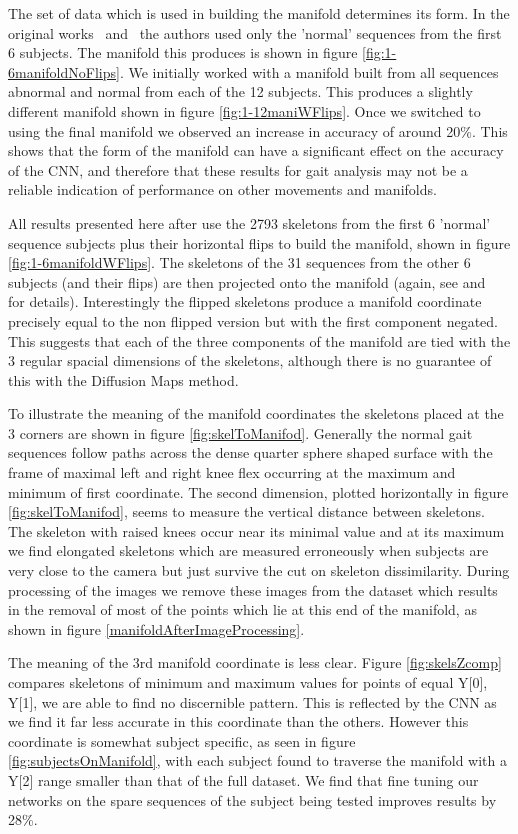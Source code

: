 \documentclass[11pt]{article} %
\begin{document}
The set of data which is used in building the manifold determines its form. In the original works~\cite{Paiement} and~\cite{Tao} the authors used only the 'normal' sequences from the first 6 subjects. The manifold this produces is shown in figure \ref{fig:1-6manifoldNoFlips}. We initially worked with a manifold built from all sequences abnormal and normal from each of the 12 subjects. This produces a slightly different manifold shown in figure \ref{fig:1-12maniWFlips}. Once we switched to using the final manifold we observed an increase in accuracy of around 20\%. This shows that the form of the manifold can have a significant effect on the accuracy of the CNN, and therefore that these results for gait analysis may not be a reliable indication of performance on other movements and manifolds.

All results presented here after use the 2793 skeletons from the first 6 'normal' sequence subjects plus their horizontal flips to build the manifold, shown in figure \ref{fig:1-6manifoldWFlips}. The skeletons of the 31 sequences from the other 6 subjects (and their flips) are then projected onto the manifold (again, see \cite{Paiement} and~\cite{Tao} for details). Interestingly the flipped skeletons produce a manifold coordinate precisely equal to the non flipped version but with the first component negated. This suggests that each of the three components of the manifold are tied with the 3 regular spacial dimensions of the skeletons, although there is no guarantee of this with the Diffusion Maps method. 

To illustrate the meaning of the manifold coordinates the skeletons placed at the 3 corners are shown in figure \ref{fig:skelToManifod}. Generally the normal gait sequences follow paths across the dense quarter sphere shaped surface with the frame of maximal left and right knee flex occurring at the maximum and minimum of first coordinate. The second dimension, plotted horizontally in figure \ref{fig:skelToManifod}, seems to measure the vertical distance between skeletons. The skeleton with raised knees occur near its minimal value and at its maximum we find elongated skeletons which are measured erroneously when subjects are very close to the camera but just survive the cut on skeleton dissimilarity. During processing of the images we remove these images from the dataset which results in the removal of most of the points which lie at this end of the manifold, as shown in figure \ref{manifoldAfterImageProcessing}. 

The meaning of the 3rd manifold coordinate is less clear. Figure \ref{fig:skelsZcomp} compares skeletons of minimum and maximum values for points of equal Y[0], Y[1], we are able to find no discernible pattern. This is reflected by the CNN as we find it far less accurate in this coordinate than the others. However this coordinate is somewhat subject specific, as seen in figure \ref{fig:subjectsOnManifold}, with each subject found to traverse the manifold with a Y[2] range smaller than that of the full dataset. We find that fine tuning our networks on the spare sequences of the subject being tested improves results by 28\%. 
\end{document}

